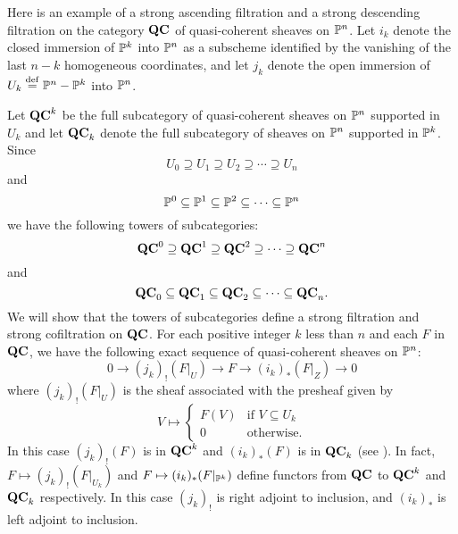 \begin{ex}
Here is an example of a strong ascending filtration and a strong
descending filtration on the category $\QCoh$ of quasi-coherent
sheaves on $\P^n$. Let $i_k$ denote the closed immersion of $\P^k$ 
into $\P^n$ as a subscheme identified by the vanishing of the last 
$n-k$ homogeneous coordinates, and let $j_k$ denote the open 
immersion of $U_k \defeq \P^n - \P^k$ into $\P^n$. 

Let $\QCoh^k$ be the full subcategory of quasi-coherent sheaves on
$\P^n$ supported in $U_k$ and let $\QCoh_k$ denote the full
subcategory of sheaves on $\P^n$ supported in $\P^k$. Since
\[
U_0 \supseteq U_1 \supseteq U_2 \supseteq \cdots \supseteq U_n
\]
and
\[
\P^0 \subseteq \P^1 \subseteq \P^2 \subseteq \cdots \subseteq \P^n
\]
we have the following towers of subcategories:
\[
\QCoh^0 \supseteq \QCoh^1 \supseteq \QCoh^2 \supseteq \cdots
   \supseteq \QCoh^n
\]
and 
\[
\QCoh_0 \subseteq \QCoh_1 \subseteq \QCoh_2 \subseteq \cdots
   \subseteq \QCoh_n.
\]
We will show that the towers of subcategories define a strong 
filtration and strong cofiltration on $\QCoh$. For each positive 
integer $k$ less than $n$ and each $F$ in $\QCoh$, we have the 
following exact sequence of quasi-coherent sheaves on $\P^n$:
\begin{equation}\label{eq_qc_sheaf_ses}
0 \to (j_k)_!(F|_U) \to F \to (i_k)_*(F|_Z) \to 0
\end{equation}
where $(j_k)_!(F|_U)$ is the sheaf associated with the presheaf 
given by
\[
V \mapsto \begin{cases}
F(V) &\textrm{if }V \subseteq U_k\\
0    &\textrm{otherwise}.
\end{cases}
\]
In this case $(j_k)_!(F)$ is in $\QCoh^k$ and $(i_k)_*(F)$ is in 
$\QCoh_k$ (see \cite[Ex. 1.19]{Hart}). In fact, $F \mapsto 
(j_k)_!(F|_{U_k})$ and $F \mapsto (i_k)_*(F|_{\P^k})$ define
functors from $\QCoh$ to $\QCoh^k$ and $\QCoh_k$
respectively. In this case $(j_k)_!$ is right adjoint to 
inclusion, and $(i_k)_*$ is left adjoint to inclusion.


\end{ex}
